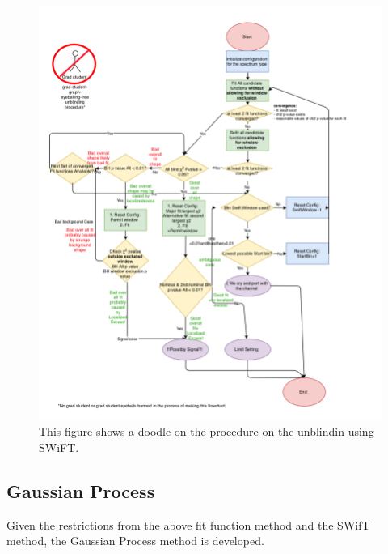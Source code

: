 \begin{figure}[!htb] \begin{center}
        \includegraphics[width=1.05\textwidth]{figures/chapter_analysismethod/swift_unblindingflowchart}
        \caption{
            This figure shows a doodle on the procedure on the unblindin using SWiFT.
        }
        \label{signalinjection}
    \end{center}
\end{figure}


    
    \subsection{Gaussian Process} 
    Given the restrictions from the above fit function method and the SWifT method, the Gaussian Process method is developed\cite{frate2017modeling}.

